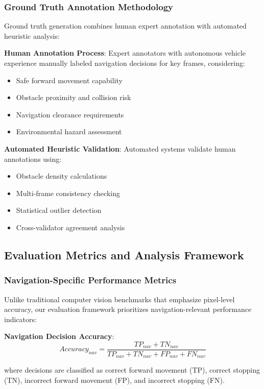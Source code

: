 \documentclass[10pt]{article}
\begin{document}
\subsubsection{Ground Truth Annotation Methodology}

Ground truth generation combines human expert annotation with automated heuristic analysis:

\textbf{Human Annotation Process}:
Expert annotators with autonomous vehicle experience manually labeled navigation decisions for key frames, considering:
\begin{itemize}
\item Safe forward movement capability
\item Obstacle proximity and collision risk
\item Navigation clearance requirements
\item Environmental hazard assessment
\end{itemize}

\textbf{Automated Heuristic Validation}:
Automated systems validate human annotations using:
\begin{itemize}
\item Obstacle density calculations
\item Multi-frame consistency checking
\item Statistical outlier detection
\item Cross-validator agreement analysis
\end{itemize}

\subsection{Evaluation Metrics and Analysis Framework}

\subsubsection{Navigation-Specific Performance Metrics}

Unlike traditional computer vision benchmarks that emphasize pixel-level accuracy, our evaluation framework prioritizes navigation-relevant performance indicators:

\textbf{Navigation Decision Accuracy}:
\begin{equation}
Accuracy_{nav} = \frac{TP_{nav} + TN_{nav}}{TP_{nav} + TN_{nav} + FP_{nav} + FN_{nav}}
\end{equation}

where decisions are classified as correct forward movement (TP), correct stopping (TN), incorrect forward movement (FP), and incorrect stopping (FN).
\end{document}
